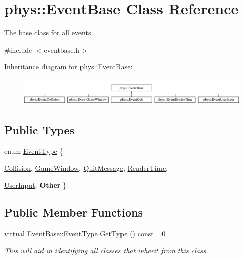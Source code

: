 \hypertarget{classphys_1_1EventBase}{
\section{phys::EventBase Class Reference}
\label{dd/d80/classphys_1_1EventBase}
}


The base class for all events.  




{\ttfamily \#include $<$eventbase.h$>$}

Inheritance diagram for phys::EventBase:\begin{figure}[H]
\begin{center}
\leavevmode
\includegraphics[height=1.391304cm]{dd/d80/classphys_1_1EventBase}
\end{center}
\end{figure}
\subsection*{Public Types}
\begin{DoxyCompactItemize}
\item 
enum \hyperlink{classphys_1_1EventBase_a5e6a8564e127f654123f0bf6a2751923}{EventType} \{ \par
\hyperlink{classphys_1_1EventBase_a5e6a8564e127f654123f0bf6a2751923adb6767503168d145497ef65a708725e5}{Collision}, 
\hyperlink{classphys_1_1EventBase_a5e6a8564e127f654123f0bf6a2751923ad094ddaa5cafeb0880c838e58b84693e}{GameWindow}, 
\hyperlink{classphys_1_1EventBase_a5e6a8564e127f654123f0bf6a2751923a84742ff55e9abdde8f5e0578d30f73a9}{QuitMessage}, 
\hyperlink{classphys_1_1EventBase_a5e6a8564e127f654123f0bf6a2751923acdfa47d279e8a1c460d557d14b85c7a5}{RenderTime}, 
\par
\hyperlink{classphys_1_1EventBase_a5e6a8564e127f654123f0bf6a2751923a320cc0817dc2c2201501b12c50c89bef}{UserInput}, 
{\bfseries Other}
 \}
\end{DoxyCompactItemize}
\subsection*{Public Member Functions}
\begin{DoxyCompactItemize}
\item 
virtual \hyperlink{classphys_1_1EventBase_a5e6a8564e127f654123f0bf6a2751923}{EventBase::EventType} \hyperlink{classphys_1_1EventBase_a1b3d29b6ecf30f18cc3e1825a515c508}{GetType} () const =0
\begin{DoxyCompactList}\small\item\em This will aid in identifying all classes that inherit from this class. \item\end{DoxyCompactList}\end{DoxyCompactItemize}


